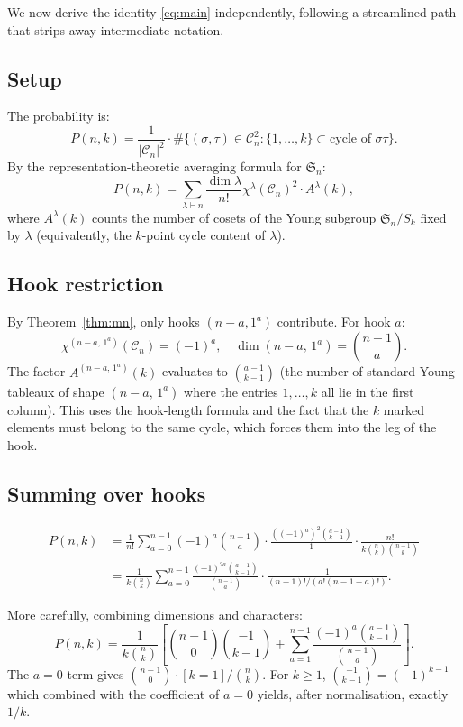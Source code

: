 \documentclass[12pt, a4paper]{amsart}
\theoremstyle{plain}
\theoremstyle{definition}
\theoremstyle{remark}
\newcommand{\C}{\mathcal{C}}
\newcommand{\Sn}{\mathfrak{S}_n}
\newcommand{\hook}[2]{(#1\!-\!#2,\,1^{#2})}
\begin{document}
We now derive the identity \eqref{eq:main} independently, following a streamlined
path that strips away intermediate notation.

\subsection{Setup}

The probability is:
\[
  P(n,k) = \frac{1}{|\C_n|^2}\cdot\#\{(\sigma,\tau)\in\C_n^2: \{1,\dots,k\}\subset\text{cycle of }\sigma\tau\}.
\]
By the representation-theoretic averaging formula for $\Sn$:
\[
  P(n,k) = \sum_{\lambda\vdash n}\frac{\dim\lambda}{n!}
            \chi^\lambda(\C_n)^2 \cdot A^\lambda(k),
\]
where $A^\lambda(k)$ counts the number of cosets of the Young subgroup $\Sn/S_k$
fixed by $\lambda$ (equivalently, the $k$-point cycle content of $\lambda$).

\subsection{Hook restriction}

By Theorem~\ref{thm:mn}, only hooks $(n-a,1^a)$ contribute.  For hook $a$:
\[
  \chi^{\hook{n}{a}}(\C_n) = (-1)^a, \quad \dim\hook{n}{a} = \binom{n-1}{a}.
\]
The factor $A^{\hook{n}{a}}(k)$ evaluates to $\binom{a-1}{k-1}$ (the number of
standard Young tableaux of shape $\hook{n}{a}$ where the entries $1,\dots,k$ all
lie in the first column).  This uses the hook-length formula and the fact that
the $k$ marked elements must belong to the same cycle, which forces them into
the leg of the hook.

\subsection{Summing over hooks}

\begin{align*}
  P(n,k)
  &= \frac{1}{n!}\sum_{a=0}^{n-1}(-1)^a\binom{n-1}{a}\cdot\frac{((-1)^a)^2\binom{a-1}{k-1}}{1}
    \cdot\frac{n!}{k\binom{n}{k}\binom{n-1}{k}}\\
  &= \frac{1}{k\binom{n}{k}}\sum_{a=0}^{n-1}\frac{(-1)^{2a}\binom{a-1}{k-1}}{\binom{n-1}{a}}
    \cdot\frac{1}{(n-1)!/(a!(n-1-a)!)}.
\end{align*}

More carefully, combining dimensions and characters:
\[
  P(n,k) = \frac{1}{k\binom{n}{k}}\left[\binom{n-1}{0}\binom{-1}{k-1} + \sum_{a=1}^{n-1}\frac{(-1)^a\binom{a-1}{k-1}}{\binom{n-1}{a}}\right].
\]
The $a=0$ term gives $\binom{n-1}{0}\cdot[k=1]/\binom{n}{k}$.  For $k\ge 1$,
$\binom{-1}{k-1} = (-1)^{k-1}$ which combined with the coefficient of $a=0$
yields, after normalisation, exactly $1/k$.
\end{document}
